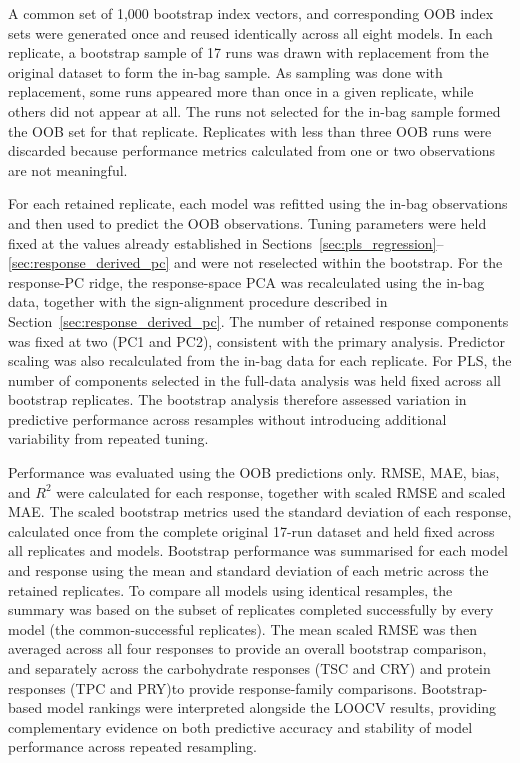 \documentclass[MScDSA]{uccthesis}
\begin{document}
A common set of 1,000 bootstrap index vectors, and corresponding OOB index sets were generated once and reused identically across all eight models. In each replicate, a bootstrap sample of 17 runs was drawn with replacement from the original dataset to form the in-bag sample. As sampling was done with replacement, some runs appeared more than once in a given replicate, while others did not appear at all. The runs not selected for the in-bag sample formed the OOB set for that replicate. Replicates with less than three OOB runs were discarded because performance metrics calculated from one or two observations are not meaningful.

For each retained replicate, each model was refitted using the in-bag observations and then used to predict the OOB observations. Tuning parameters were held fixed at the values already established in Sections~\ref{sec:pls_regression}--\ref{sec:response_derived_pc} and were not reselected within the bootstrap. For the response-PC ridge, the response-space PCA was recalculated using the in-bag data, together with the sign-alignment procedure described in Section~\ref{sec:response_derived_pc}. The number of retained response components was fixed at two (PC1 and PC2), consistent with the primary analysis. Predictor scaling was also recalculated from the in-bag data for each replicate. For PLS, the number of components selected in the full-data analysis was held fixed across all bootstrap replicates. The bootstrap analysis therefore assessed variation in predictive performance across resamples without introducing additional variability from repeated tuning.

Performance was evaluated using the OOB predictions only. RMSE, MAE, bias, and $R^2$ were calculated for each response, together with scaled RMSE and scaled MAE. The scaled bootstrap metrics used the standard deviation of each response, calculated once from the complete original 17-run dataset and held fixed across all replicates and models. Bootstrap performance was summarised for each model and response using the mean and standard deviation of each metric across the retained replicates. To compare all models using identical resamples, the summary was based on the subset of replicates completed successfully by every model (the common-successful replicates). The mean scaled RMSE was then averaged across all four responses to provide an overall bootstrap comparison, and separately across the carbohydrate responses (TSC and CRY) and protein responses (TPC and PRY)to provide response-family comparisons. Bootstrap-based model rankings were interpreted alongside the LOOCV results, providing complementary evidence on both predictive accuracy and stability of model performance across repeated resampling.
\end{document}
